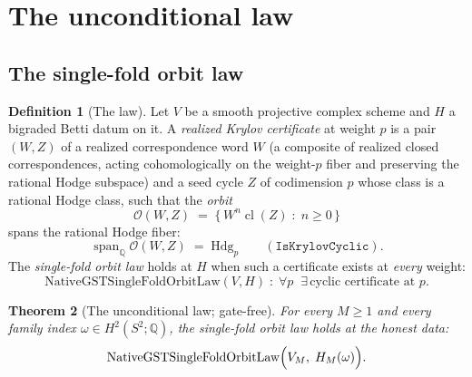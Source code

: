 \documentclass[11pt,a4paper]{article}
\theoremstyle{plain}
\newtheorem{theorem}{Theorem}[section]
\theoremstyle{definition}
\newtheorem{definition}[theorem]{Definition}
\newcommand{\Q}{\mathbb{Q}}
\newcommand{\Span}{\operatorname{span}}
\newcommand{\cl}{\operatorname{cl}}
\begin{document}
\section{The unconditional law}\label{sec:law}

\subsection{The single-fold orbit law}

\begin{definition}[The law]\label{def:law}
Let $V$ be a smooth projective complex scheme and $H$ a bigraded
Betti datum on it.  A \emph{realized Krylov certificate} at weight
$p$ is a pair $(W, Z)$ of a realized correspondence word $W$ (a
composite of realized closed correspondences, acting cohomologically
on the weight-$p$ fiber and preserving the rational Hodge subspace)
and a seed cycle $Z$ of codimension $p$ whose class is a rational
Hodge class, such that the \emph{orbit}
\[
\mathcal{O}(W,Z) \;=\; \bigl\{\, W^n \cl(Z) \;:\; n \ge 0 \,\bigr\}
\]
spans the rational Hodge fiber:
\[
\Span_\Q \mathcal{O}(W,Z) \;=\; \mathrm{Hdg}_p
\qquad
(\texttt{IsKrylovCyclic}).
\]
The \emph{single-fold orbit law} holds at $H$ when such a certificate
exists at \emph{every} weight:
\[
\mathrm{NativeGSTSingleFoldOrbitLaw}(V,H) \;:\;
\forall p \;\; \exists\, \text{cyclic certificate at } p .
\]
\end{definition}

\begin{theorem}[The unconditional law; gate-free]
\label{thm:law}
For every $M \ge 1$ and every family index $\omega \in H^2(S^2;\Q)$,
the single-fold orbit law holds at the honest data:
\[
\mathrm{NativeGSTSingleFoldOrbitLaw}\Bigl( V_M,\; H_M(\omega) \Bigr).
\]
\end{theorem}
\end{document}
